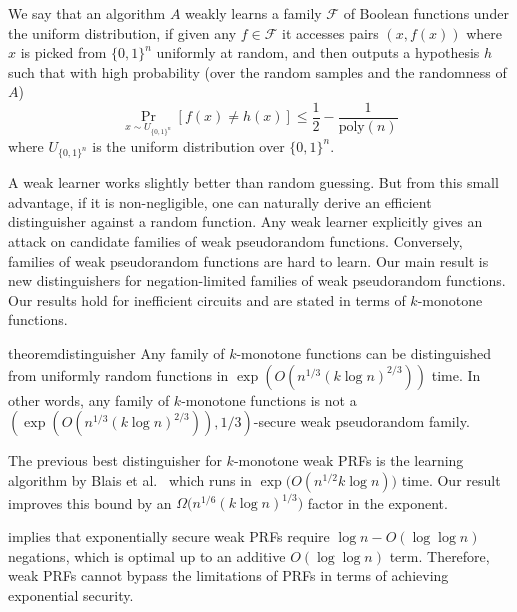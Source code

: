\documentclass{toc}
\newcommand{\poly}{\text{poly}}
\newcommand{\cF}{\mathcal{F}}
\newcommand{\warn}[1]{#1}
\begin{document}
%
%
%
%
%
%
%
\begin{definition} %
We say that an algorithm $A$ weakly learns a family
%
$\cF$ of Boolean functions %
under the uniform distribution, %
%
%
%
if given any $f\in \cF$ it accesses pairs $(x,f(x))$ where $x$ is picked from $\{0,1\}^n$ uniformly at random, and then %
%
%
%
%
%
outputs a hypothesis $h$ such that with high probability \warn{(over the random samples and the randomness of $A$)}
%
\begin{equation} %
 \Pr_{x \sim U_{\{0, 1\}^n}}\left[ f(x) \neq h(x) \right] \le \frac{1}{2}-\frac{1}{\poly(n)}   
%
\end{equation} %
where $U_{\{0,1\}^n}$ is the uniform distribution over $\{0,1\}^n$.
\end{definition}

A weak learner works slightly better than random guessing. But from this small
advantage, if %
it is  %
non-negligible,
one can naturally derive an efficient distinguisher against
a  %
random function.
Any weak learner explicitly gives an attack on  %
%
candidate families of weak pseudorandom functions.  %
Conversely,  %
families of %
%
%
weak pseudorandom functions are hard to learn.
Our main result is new distinguishers for negation-limited %
families of %
weak pseudorandom functions. Our results hold for inefficient circuits and are stated in terms of $k$-monotone functions.

\begin{restatable}{theorem}{distinguisher}\label{thm:distinguisher}
Any family of $k$-monotone functions can be distinguished from uniformly random functions in $\exp\left(O(n^{1/3}(k\log n)^{2/3})\right)$ time.
In other words, any family of $k$-monotone functions is not a
	  $\left(\exp\left(O(n^{1/3}(k\log n)^{2/3})\right),1/3\right)$-secure
	  weak pseudorandom family.
\end{restatable}
The previous best distinguisher for $k$-monotone weak PRFs is the learning algorithm by Blais et al.~\cite{BCOST15} which runs in $\exp\big(O(n^{1/2}k\log n)\big)$ time. Our result improves
this bound by %
an $\Omega\big(n^{1/6}(k\log n)^{1/3}\big)$ factor in the exponent.

 implies that
%
%
exponentially secure weak PRFs require  %
%
$\log{n}-O(\log\log{n})$ negations, which is optimal up to an additive $O(\log\log{n})$ term. Therefore, weak PRFs cannot bypass the limitations of PRFs in terms of achieving exponential security.
\end{document}

